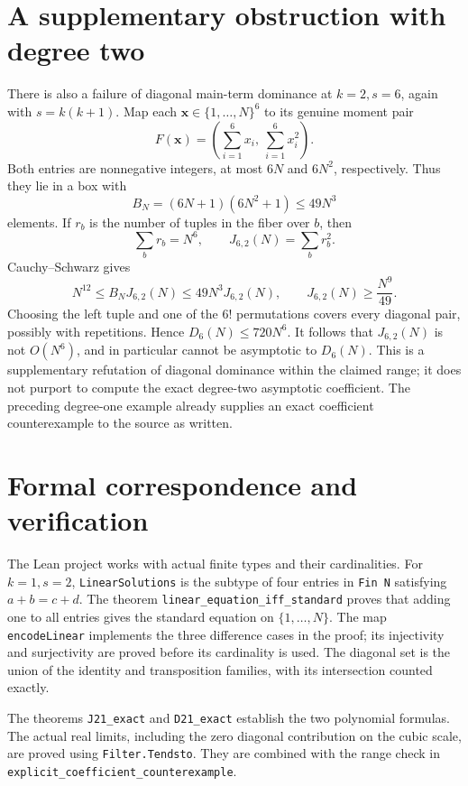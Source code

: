 \documentclass[11pt]{article}
\begin{document}
\section*{A supplementary obstruction with degree two}
There is also a failure of diagonal main-term dominance at $k=2,s=6$, again with $s=k(k+1)$. Map each $\boldsymbol x\in\{1,\ldots,N\}^6$ to its genuine moment pair
\[
 F(\boldsymbol x)=\left(\sum_{i=1}^6 x_i,\ \sum_{i=1}^6 x_i^2\right).
\]
Both entries are nonnegative integers, at most $6N$ and $6N^2$, respectively. Thus they lie in a box with
\[
 B_N=(6N+1)(6N^2+1)\leq49N^3
\]
elements. If $r_b$ is the number of tuples in the fiber over $b$, then
\[
 \sum_b r_b=N^6,\qquad J_{6,2}(N)=\sum_b r_b^2.
\]
Cauchy--Schwarz gives
\[
 N^{12}\leq B_N J_{6,2}(N)\leq49N^3J_{6,2}(N),
 \qquad J_{6,2}(N)\geq\frac{N^9}{49}.
\]
Choosing the left tuple and one of the $6!$ permutations covers every diagonal pair, possibly with repetitions. Hence $D_6(N)\leq720N^6$. It follows that $J_{6,2}(N)$ is not $O(N^6)$, and in particular cannot be asymptotic to $D_6(N)$. This is a supplementary refutation of diagonal dominance within the claimed range; it does not purport to compute the exact degree-two asymptotic coefficient. The preceding degree-one example already supplies an exact coefficient counterexample to the source as written.

\section*{Formal correspondence and verification}
The Lean project works with actual finite types and their cardinalities. For $k=1,s=2$, \texttt{LinearSolutions} is the subtype of four entries in \texttt{Fin N} satisfying $a+b=c+d$. The theorem \texttt{linear\_equation\_iff\_standard} proves that adding one to all entries gives the standard equation on $\{1,\ldots,N\}$. The map \texttt{encodeLinear} implements the three difference cases in the proof; its injectivity and surjectivity are proved before its cardinality is used. The diagonal set is the union of the identity and transposition families, with its intersection counted exactly.

The theorems \texttt{J21\_exact} and \texttt{D21\_exact} establish the two polynomial formulas. The actual real limits, including the zero diagonal contribution on the cubic scale, are proved using \texttt{Filter.Tendsto}. They are combined with the range check in \texttt{explicit\_\allowbreak coefficient\_\allowbreak counterexample}.
\end{document}
